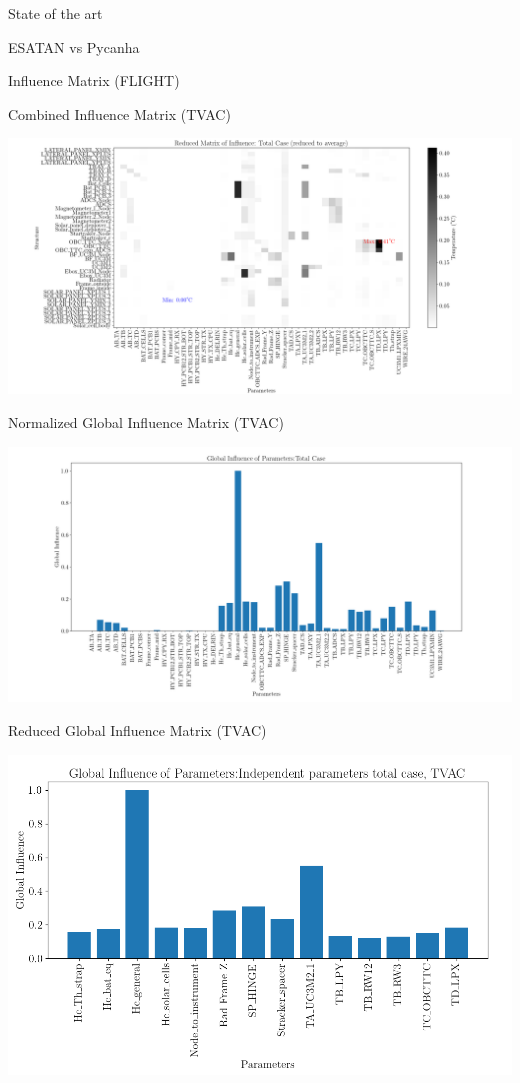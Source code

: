 \documentclass{cubeamer}
\begin{document}
\begin{frame}{State of the art}
\begin{minipage}{0.65\textwidth}
\begin{frame}{ESATAN vs Pycanha}
\begin{frame}{Influence Matrix (FLIGHT)}
\end{frame}

\begin{frame}{Combined Influence Matrix (TVAC)}
\begin{center}

    \includegraphics[width=0.9\linewidth]{Figures/TVAC/infmatTC.png}
\end{center}

\end{frame}

\begin{frame}{Normalized Global Influence Matrix (TVAC)}
\begin{center}
 
    \includegraphics[width=0.9\linewidth]{Figures/TVAC/global-inf-TC.png}

\end{center}

\end{frame}

\begin{frame}{Reduced Global Influence Matrix (TVAC)}
\begin{center}

    \includegraphics[width=0.7\linewidth]{Figures/TVAC/parameters-imp-tvac2.png}
\end{center}


\end{frame}
\end{frame}
\end{minipage}
\end{frame}
\end{document}
